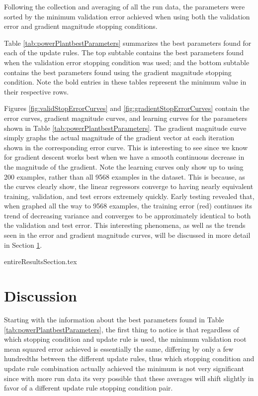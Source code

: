 \documentclass[runningheads]{llncs}
\begin{document}
Following the collection and averaging of all the run data, the parameters were sorted by the minimum validation error achieved when using both the validation error and gradient magnitude stopping conditions. 

Table \ref{tab:powerPlantbestParameters} summarizes the best parameters found for each of the update rules. The top subtable contains the best parameters found when the validation error stopping condition was used; and the bottom subtable contains the best parameters found using the gradient magnitude stopping condition. Note the bold entries in these tables represent the minimum value in their respective rows. 

Figures \ref{fig:validStopErrorCurves} and \ref{fig:gradientStopErrorCurves} contain the error curves, gradient magnitude curves, and learning curves for the parameters shown in Table \ref{tab:powerPlantbestParameters}. The gradient magnitude curve simply graphs the actual magnitude of the gradient vector at each iteration shown in the corresponding error curve. This is interesting to see since we know for gradient descent works best when we have a smooth continuous decrease in the magnitude of the gradient. Note the learning curves only show up to using 200 examples, rather than all 9568 examples in the dataset. This is because, as the curves clearly show, the linear regressors converge to having nearly equivalent training, validation, and test errors extremely quickly. Early testing revealed that, when graphed all the way to 9568 examples, the training error (red) continues its trend of decreasing variance and converges to be approximately identical to both the validation and test error. This interesting phenomena, as well as the trends seen in the error and gradient magnitude curves, will be discussed in more detail in Section \ref{sec:discussion}.

{entireResultsSection.tex}

\clearpage

\section {Discussion}
\label{sec:discussion}

Starting with the information about the best parameters found in Table \ref{tab:powerPlantbestParameters}, the first thing to notice is that regardless of which stopping condition and update rule is used, the minimum validation root mean squared error achieved is essentially the same, differing by only a few hundredths between the different update rules, thus which stopping condition and update rule combination actually achieved the minimum is not very significant since with more run data its very possible that these averages will shift slightly in favor of a different update rule stopping condition pair. 
\end{document}
